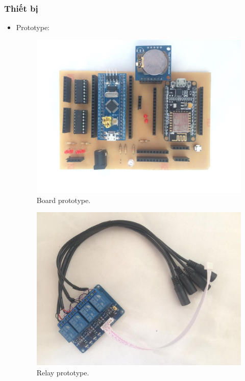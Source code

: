 \documentclass[a4paper,12pt,oneside]{article}
\begin{document}
\subsubsection{Thiết bị}

\begin{itemize}
\item Prototype:
	\begin{figure}[H]
	\begin{center}
	\includegraphics[scale=.15]{hinh/prototype_board.jpg}
	\end{center}
	\caption{Board prototype.}
	\end{figure}
	
	\begin{figure}[H]
	\begin{center}
	\includegraphics[scale=.4]{hinh/relay_prototype.jpg}
	\end{center}
	\caption{Relay prototype.}
	\end{figure}
	

\end{itemize}
\end{document}

